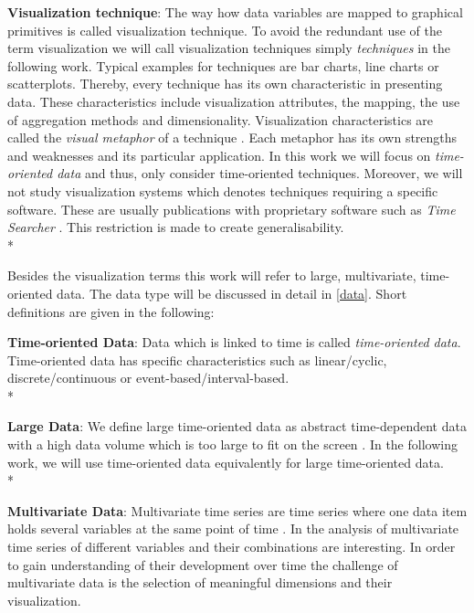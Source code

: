 \textbf{Visualization technique}: The way how data variables are mapped to graphical primitives is called visualization technique. To avoid the redundant use of the term visualization we will call visualization techniques simply \textit{techniques} in the following work. Typical examples for techniques are bar charts, line charts or scatterplots. Thereby, every technique has its own characteristic in presenting data. These characteristics include visualization attributes, the mapping, the use of aggregation methods and dimensionality. Visualization characteristics are called the \textit{visual metaphor} of a technique  \cite{Tegarden1999}. Each metaphor has its own strengths and weaknesses and its particular application. In this work we will focus on \textit{time-oriented data} and thus, only consider time-oriented techniques. Moreover, we will not study visualization systems which denotes techniques requiring a specific software. These are usually publications with proprietary software such as \textit{Time Searcher}  \cite{Hochheiser2004,Buono2005}. This restriction is made to create generalisability.\\*

Besides the visualization terms this work will refer to large, multivariate, time-oriented data. The data type will be discussed in detail in \ref{data}. Short definitions are given in the following: 

\textbf{Time-oriented Data}: Data which is linked to time  \cite{Aigner2011} is called \textit{time-oriented data}. Time-oriented data has specific characteristics such as linear/cyclic, discrete/continuous or event-based/interval-based. \\*

\textbf{Large Data}: We define large time-oriented data as abstract time-dependent data with a high data volume which is too large to fit on the screen  \cite{Shneiderman2008}. 
In the following work, we will use time-oriented data equivalently for large time-oriented data. \\*

\textbf{Multivariate Data}: 
Multivariate time series are time series where one data item holds several variables at the same point of time \cite{Aigner2011}. In the analysis of multivariate time series of different variables and their combinations are interesting. In order to gain understanding of their development over time the challenge of multivariate data is the selection of meaningful dimensions and their visualization. 

